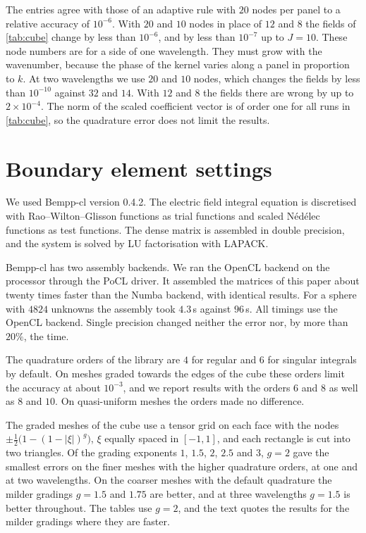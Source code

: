 The entries agree with those of an adaptive rule with $20$ nodes per panel to a relative accuracy of $10^{-6}$. With $20$ and $10$ nodes in place of $12$ and $8$ the fields of \autoref{tab:cube} change by less than $10^{-6}$, and by less than $10^{-7}$ up to $J = 10$. These node numbers are for a side of one wavelength. They must grow with the wavenumber, because the phase of the kernel varies along a panel in proportion to $k$. At two wavelengths we use $20$ and $10$ nodes, which changes the fields by less than $10^{-10}$ against $32$ and $14$. With $12$ and $8$ the fields there are wrong by up to $2\times10^{-4}$. The norm of the scaled coefficient vector is of order one for all runs in \autoref{tab:cube}, so the quadrature error does not limit the results.

\section{Boundary element settings}
\label{sec:bempp}

We used Bempp-cl version 0.4.2. The electric field integral equation is discretised with Rao--Wilton--Glisson functions as trial functions and scaled N\'ed\'elec functions as test functions. The dense matrix is assembled in double precision, and the system is solved by LU factorisation with LAPACK.

Bempp-cl has two assembly backends. We ran the OpenCL backend on the processor through the PoCL driver. It assembled the matrices of this paper about twenty times faster than the Numba backend, with identical results. For a sphere with $4824$ unknowns the assembly took $4.3$\,s against $96$\,s. All timings use the OpenCL backend. Single precision changed neither the error nor, by more than $20\%$, the time.

The quadrature orders of the library are $4$ for regular and $6$ for singular integrals by default. On meshes graded towards the edges of the cube these orders limit the accuracy at about $10^{-3}$, and we report results with the orders $6$ and $8$ as well as $8$ and $10$. On quasi-uniform meshes the orders made no difference.

The graded meshes of the cube use a tensor grid on each face with the nodes $\pm\tfrac12\bigl(1-(1-|\xi|)^{g}\bigr)$, $\xi$ equally spaced in $[-1,1]$, and each rectangle is cut into two triangles. Of the grading exponents $1$, $1.5$, $2$, $2.5$ and $3$, $g = 2$ gave the smallest errors on the finer meshes with the higher quadrature orders, at one and at two wavelengths. On the coarser meshes with the default quadrature the milder gradings $g = 1.5$ and $1.75$ are better, and at three wavelengths $g = 1.5$ is better throughout. The tables use $g = 2$, and the text quotes the results for the milder gradings where they are faster.

